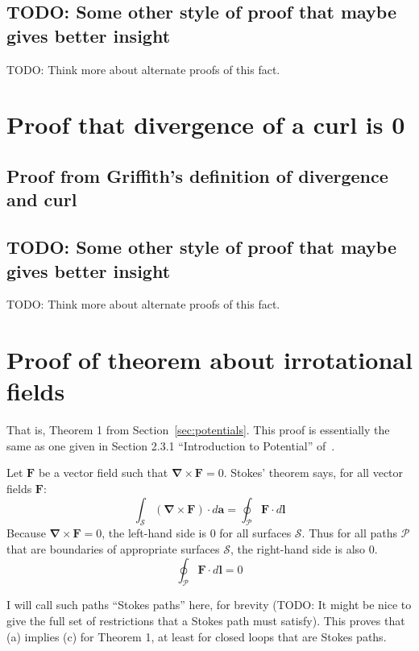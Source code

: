 \documentclass[a4paper]{article}
\theoremstyle{plain}
\theoremstyle{definition}
\newcommand{\vect}[1]{\textbf{#1}}
\newcommand{\del}{\bm{\nabla}}
\begin{document}
\subsection{TODO: Some other style of proof that maybe gives better insight}

TODO: Think more about alternate proofs of this fact.


\section{Proof that divergence of a curl is 0}
\label{sec:divofcurlis0}

\subsection{Proof from Griffith's definition of divergence and curl}


\subsection{TODO: Some other style of proof that maybe gives better insight}

TODO: Think more about alternate proofs of this fact.


\section{Proof of theorem about irrotational fields}
\label{sec:potentialsthm1}

That is, Theorem 1 from Section~\ref{sec:potentials}.  This proof is
essentially the same as one given in Section 2.3.1 ``Introduction to
Potential'' of~\cite{Griffiths1998}.

Let $\vect{F}$ be a vector field such that $\del \times \vect{F} = 0$.
Stokes' theorem says, for all vector fields $\vect{F}$:
\begin{equation}
\int_{\mathcal{S}} (\del \times \vect{F}) \cdot d\vect{a} = \oint_{\mathcal{P}} \vect{F} \cdot d\vect{l} \nonumber
\end{equation}
Because $\del \times \vect{F} = 0$, the left-hand side is 0 for all
surfaces $\mathcal{S}$.  Thus for all paths $\mathcal{P}$ that are
boundaries of appropriate surfaces $\mathcal{S}$, the right-hand side
is also 0.
\begin{equation}
\oint_{\mathcal{P}} \vect{F} \cdot d\vect{l} = 0 \label{eq:thm1allpathintegrals0}
\end{equation}

I will call such paths ``Stokes paths'' here, for brevity (TODO: It
might be nice to give the full set of restrictions that a Stokes path
must satisfy).
This proves that (a) implies (c) for Theorem 1, at least for closed
loops that are Stokes paths.
\end{document}
